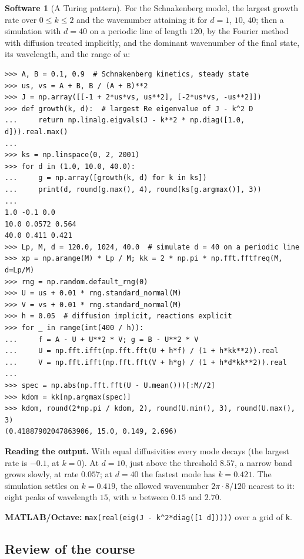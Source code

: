 \documentclass[11pt,a4paper]{article}
\numberwithin{equation}{section}
\theoremstyle{definition}
\newtheorem{software}[thm]{Software}
\begin{document}
\begin{software}[A Turing pattern]
\label{sw:turing}
For the Schnakenberg model, the largest growth rate over $0 \leq k \leq 2$ and the wavenumber attaining it for $d = 1$, $10$, $40$; then a simulation with $d = 40$ on a periodic line of length $120$, by the Fourier method with diffusion treated implicitly, and the dominant wavenumber of the final state, its wavelength, and the range of $u$:
{\small\begin{verbatim}
>>> A, B = 0.1, 0.9  # Schnakenberg kinetics, steady state
>>> us, vs = A + B, B / (A + B)**2
>>> J = np.array([[-1 + 2*us*vs, us**2], [-2*us*vs, -us**2]])
>>> def growth(k, d):  # largest Re eigenvalue of J - k^2 D
...     return np.linalg.eigvals(J - k**2 * np.diag([1.0, d])).real.max()
...
>>> ks = np.linspace(0, 2, 2001)
>>> for d in (1.0, 10.0, 40.0):
...     g = np.array([growth(k, d) for k in ks])
...     print(d, round(g.max(), 4), round(ks[g.argmax()], 3))
...
1.0 -0.1 0.0
10.0 0.0572 0.564
40.0 0.411 0.421
>>> Lp, M, d = 120.0, 1024, 40.0  # simulate d = 40 on a periodic line
>>> xp = np.arange(M) * Lp / M; kk = 2 * np.pi * np.fft.fftfreq(M, d=Lp/M)
>>> rng = np.random.default_rng(0)
>>> U = us + 0.01 * rng.standard_normal(M)
>>> V = vs + 0.01 * rng.standard_normal(M)
>>> h = 0.05  # diffusion implicit, reactions explicit
>>> for _ in range(int(400 / h)):
...     f = A - U + U**2 * V; g = B - U**2 * V
...     U = np.fft.ifft(np.fft.fft(U + h*f) / (1 + h*kk**2)).real
...     V = np.fft.ifft(np.fft.fft(V + h*g) / (1 + h*d*kk**2)).real
...
>>> spec = np.abs(np.fft.fft(U - U.mean()))[:M//2]
>>> kdom = kk[np.argmax(spec)]
>>> kdom, round(2*np.pi / kdom, 2), round(U.min(), 3), round(U.max(), 3)
(0.41887902047863906, 15.0, 0.149, 2.696)
\end{verbatim}}
\textbf{Reading the output.} With equal diffusivities every mode decays (the largest rate is $-0.1$, at $k = 0$). At $d = 10$, just above the threshold $8.57$, a narrow band grows slowly, at rate $0.057$; at $d = 40$ the fastest mode has $k = 0.421$. The simulation settles on $k = 0.419$, the allowed wavenumber $2\pi\cdot 8/120$
nearest to it: eight peaks of wavelength $15$, with $u$ between $0.15$ and $2.70$.

\textbf{MATLAB/Octave:} \texttt{max(real(eig(J - k\^{}2*diag([1 d]))))} over a grid of \texttt{k}.
\end{software}

\subsection{Review of the course}
\label{ssec:review}
\end{document}
